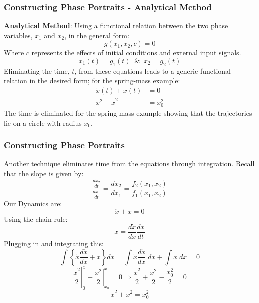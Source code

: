 \documentclass[11pt,handout]{beamer}   %
\begin{document}
\begin{frame}
\frametitle{Constructing Phase Portraits - Analytical Method}
\textbf{Analytical Method}: Using a functional relation between the two phase variables, $x_1$ and $x_2$, in the general form:
\begin{equation*}
g(x_1,x_2,c) = 0
\end{equation*}
Where $c$ represents the effects of initial conditions and external input signals.
\begin{equation*}
x_1(t) = g_1(t) \;\; \& \;\; x_2 = g_2(t)
\end{equation*}
Eliminating the time, $t$, from these equations leads to a generic functional relation in the desired form; for the spring-mass example:
\begin{equation*}
\begin{aligned}
\ddot{x}(t) + x(t) &= 0\\
x^2 + \dot{x}^2 &= x_0^2
\end{aligned}
\end{equation*}
The time is eliminated for the spring-mass example showing that the trajectories lie on a circle with radius $x_0$.
\end{frame}

\begin{frame}
\frametitle{Constructing Phase Portraits}
\small
Another technique eliminates time from the equations through integration. Recall that the slope is given by:
\begin{equation*}
\frac{\frac{dx_2}{dt}}{\frac{dx_1}{dt}} = \frac{dx_2}{dx_1} = \frac{f_2(x_1,x_2)}{f_1(x_1,x_2)}
\end{equation*}
Our Dynamics are:
\begin{equation*}
\ddot{x}+x = 0
\end{equation*}
Using the chain rule:
\begin{equation*}
\ddot{x} = \frac{d\dot{x}}{dx}\frac{dx}{dt}
\end{equation*}
Plugging in and integrating this:
\begin{equation*}
\int \left\lbrace \dot{x} \frac{d\dot{x}}{dx} + x \right\rbrace dx = \int \dot{x}\frac{d\dot{x}}{dx} \; dx + \int x \; dx = 0
\end{equation*}
\begin{equation*}
\left. \frac{\dot{x}^2}{2} \right |_0^x + \left. \frac{x^2}{2} \right |_{x_0}^x = 0 \Rightarrow \frac{\dot{x}^2}{2} + \frac{x^2}{2} - \frac{x_0^2}{2} = 0
\end{equation*}
\begin{equation*}
\dot{x}^2 + x^2 = x_0^2
\end{equation*}
\end{frame}
\end{document}
